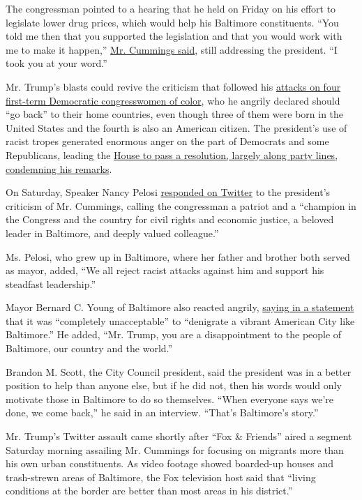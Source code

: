 The congressman pointed to a hearing that he held on Friday on his
effort to legislate lower drug prices, which would help his Baltimore
constituents. ``You told me then that you supported the legislation and
that you would work with me to make it happen,''
\href{https://twitter.com/RepCummings/status/1155132219977031683}{Mr.
Cummings said}, still addressing the president. ``I took you at your
word.''

Mr. Trump's blasts could revive the criticism that followed his
\href{https://www.nytimes3xbfgragh.onion/2019/07/14/us/politics/trump-twitter-squad-congress.html}{attacks
on four first-term Democratic congresswomen of color}, who he angrily
declared should ``go back'' to their home countries, even though three
of them were born in the United States and the fourth is also an
American citizen. The president's use of racist tropes generated
enormous anger on the part of Democrats and some Republicans, leading
the
\href{https://www.nytimes3xbfgragh.onion/2019/07/16/us/politics/trump-tweet-house-vote.html}{House
to pass a resolution, largely along party lines, condemning his
remarks}.

On Saturday, Speaker Nancy Pelosi
\href{https://mobile.twitter.com/speakerpelosi/status/1155148508296613889}{responded
on Twitter} to the president's criticism of Mr. Cummings, calling the
congressman a patriot and a ``champion in the Congress and the country
for civil rights and economic justice, a beloved leader in Baltimore,
and deeply valued colleague.''

Ms. Pelosi, who grew up in Baltimore, where her father and brother both
served as mayor, added, ``We all reject racist attacks against him and
support his steadfast leadership.''

Mayor Bernard C. Young of Baltimore also reacted angrily,
\href{https://twitter.com/mayorbcyoung/status/1155137643245690881?s=20}{saying
in a statement} that it was ``completely unacceptable'' to ``denigrate a
vibrant American City like Baltimore.'' He added, ``Mr. Trump, you are a
disappointment to the people of Baltimore, our country and the world.''

Brandon M. Scott, the City Council president, said the president was in
a better position to help than anyone else, but if he did not, then his
words would only motivate those in Baltimore to do so themselves. ``When
everyone says we're done, we come back,'' he said in an interview.
``That's Baltimore's story.''

Mr. Trump's Twitter assault came shortly after ``Fox \& Friends'' aired
a segment Saturday morning assailing Mr. Cummings for focusing on
migrants more than his own urban constituents. As video footage showed
boarded-up houses and trash-strewn areas of Baltimore, the Fox
television host said that ``living conditions at the border are better
than most areas in his district.''

